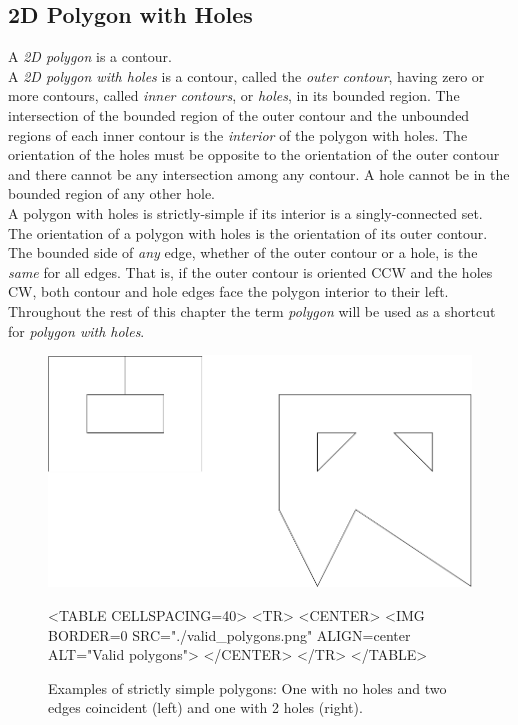 \subsection{2D Polygon with Holes}

A {\em 2D polygon} is a contour.\\
A {\em 2D polygon with holes} is a contour, called the {\em outer contour}, having zero or more contours, called {\em inner contours}, or {\em holes}, in its bounded region. The intersection of the bounded region of the outer contour and the unbounded regions of each inner contour is the {\em interior} of the polygon with holes. The orientation of the holes must be opposite to the orientation of the outer contour and there cannot be any intersection among any contour. A hole cannot be in the bounded region of any other hole.\\
A polygon with holes is strictly-simple if its interior is a singly-connected set.\\
The orientation of a polygon with holes is the orientation of its outer contour. The bounded side of \textit{any} edge, whether of the outer contour or a hole, is the \textit{same} for all edges. That is, if the outer contour is oriented CCW and the holes CW, both contour and hole edges face the polygon interior to their left.\\

Throughout the rest of this chapter the term {\em polygon} will be used as a shortcut for {\em polygon with holes}. 

\begin{figure}[htbp]
\begin{ccTexOnly}
\begin{center}
\includegraphics{Straight_skeleton_2/valid_polygons} %
\end{center}
\end{ccTexOnly}
\begin{ccHtmlOnly}
<TABLE CELLSPACING=40>
<TR>
<CENTER>
<IMG BORDER=0 SRC="./valid_polygons.png" ALIGN=center ALT="Valid polygons">
</CENTER>
</TR>
</TABLE>
\end{ccHtmlOnly}
\caption{Examples of strictly simple polygons: One with no holes and two edges coincident (left) and one with 2 holes (right).
\label{Valid-polygons}}
\end{figure}

